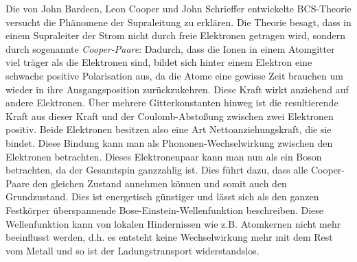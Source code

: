 Die von John Bardeen, Leon Cooper und John Schrieffer entwickelte BCS-Theorie versucht die Phänomene der Supraleitung zu erklären. Die Theorie besagt, dass in einem Supraleiter der Strom nicht durch freie Elektronen getragen wird, sondern durch sogenannte \emph{Cooper-Paare}: Dadurch, dass die Ionen in einem Atomgitter viel träger als die Elektronen sind, bildet sich hinter einem Elektron eine schwache positive Polarisation aus, da die Atome eine gewisse Zeit brauchen um wieder in ihre Ausgangsposition zurückzukehren. Diese Kraft wirkt anziehend auf andere Elektronen. Über mehrere Gitterkonstanten hinweg ist die resultierende Kraft aus dieser Kraft und der Coulomb-Abstoßung zwischen zwei Elektronen positiv. Beide Elektronen besitzen also eine Art Nettoanziehungskraft, die sie bindet. Diese Bindung kann man als Phononen-Wechselwirkung zwischen den Elektronen betrachten. Dieses Elektronenpaar kann man nun als ein Boson betrachten, da der Gesamtspin ganzzahlig ist. Dies führt dazu, dass alle Cooper-Paare den gleichen Zustand annehmen können und somit auch den Grundzustand. Dies ist energetisch günstiger und lässt sich als den ganzen Festkörper überspannende Bose-Einstein-Wellenfunktion beschreiben. Diese Wellenfunktion kann von lokalen Hindernissen wie z.B. Atomkernen nicht mehr beeinflusst werden, d.h. es entsteht keine Wechselwirkung mehr mit dem Rest vom Metall  und so ist der Ladungstransport widerstandslos.